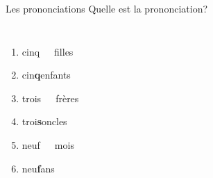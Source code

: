 \begin{frame}{Les prononciations}
  Quelle est la prononciation? \\
  \begin{columns}
      \begin{enumerate}
        \item cinq\ \ \ filles
        \item cin\textbf<2->{q}enfants
        \item trois\ \ \ frères
        \item troi\textbf<3->{s}oncles
        \item neuf\ \ \ mois
        \item neu\textbf<5->{f}ans
      \end{enumerate}
      \begin{minipage}[c][0.6\textheight]{\linewidth}
        \begin{center}
        \end{center}
      \end{minipage}
  \end{columns}
\end{frame}